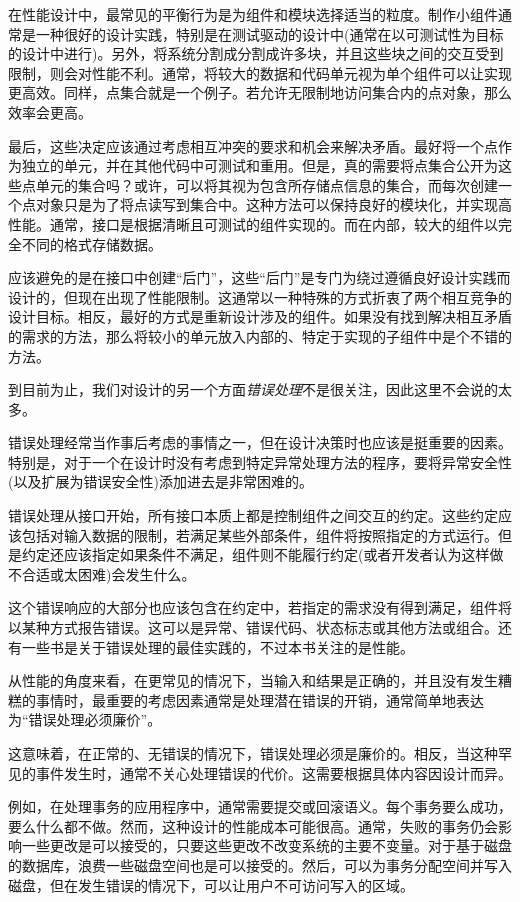 在性能设计中，最常见的平衡行为是为组件和模块选择适当的粒度。制作小组件通常是一种很好的设计实践，特别是在测试驱动的设计中(通常在以可测试性为目标的设计中进行)。另外，将系统分割成分割成许多块，并且这些块之间的交互受到限制，则会对性能不利。通常，将较大的数据和代码单元视为单个组件可以让实现更高效。同样，点集合就是一个例子。若允许无限制地访问集合内的点对象，那么效率会更高。 

最后，这些决定应该通过考虑相互冲突的要求和机会来解决矛盾。最好将一个点作为独立的单元，并在其他代码中可测试和重用。但是，真的需要将点集合公开为这些点单元的集合吗？或许，可以将其视为包含所存储点信息的集合，而每次创建一个点对象只是为了将点读写到集合中。这种方法可以保持良好的模块化，并实现高性能。通常，接口是根据清晰且可测试的组件实现的。而在内部，较大的组件以完全不同的格式存储数据。 

应该避免的是在接口中创建“后门”，这些“后门”是专门为绕过遵循良好设计实践而设计的，但现在出现了性能限制。这通常以一种特殊的方式折衷了两个相互竞争的设计目标。相反，最好的方式是重新设计涉及的组件。如果没有找到解决相互矛盾的需求的方法，那么将较小的单元放入内部的、特定于实现的子组件中是个不错的方法。

到目前为止，我们对设计的另一个方面\textit{错误处理}不是很关注，因此这里不会说的太多。


错误处理经常当作事后考虑的事情之一，但在设计决策时也应该是挺重要的因素。特别是，对于一个在设计时没有考虑到特定异常处理方法的程序，要将异常安全性(以及扩展为错误安全性)添加进去是非常困难的。

错误处理从接口开始，所有接口本质上都是控制组件之间交互的约定。这些约定应该包括对输入数据的限制，若满足某些外部条件，组件将按照指定的方式运行。但是约定还应该指定如果条件不满足，组件则不能履行约定(或者开发者认为这样做不合适或太困难)会发生什么。 

这个错误响应的大部分也应该包含在约定中，若指定的需求没有得到满足，组件将以某种方式报告错误。这可以是异常、错误代码、状态标志或其他方法或组合。还有一些书是关于错误处理的最佳实践的，不过本书关注的是性能。

从性能的角度来看，在更常见的情况下，当输入和结果是正确的，并且没有发生糟糕的事情时，最重要的考虑因素通常是处理潜在错误的开销，通常简单地表达为“错误处理必须廉价”。

这意味着，在正常的、无错误的情况下，错误处理必须是廉价的。相反，当这种罕见的事件发生时，通常不关心处理错误的代价。这需要根据具体内容因设计而异。 

例如，在处理事务的应用程序中，通常需要提交或回滚语义。每个事务要么成功，要么什么都不做。然而，这种设计的性能成本可能很高。通常，失败的事务仍会影响一些更改是可以接受的，只要这些更改不改变系统的主要不变量。对于基于磁盘的数据库，浪费一些磁盘空间也是可以接受的。然后，可以为事务分配空间并写入磁盘，但在发生错误的情况下，可以让用户不可访问写入的区域。

